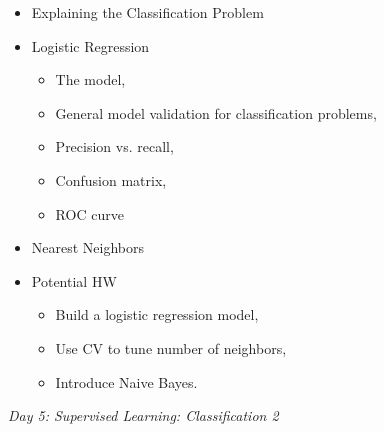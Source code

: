 \documentclass[12pt]{article}
\begin{document}
	\noindent
	\begin{itemize}
		\item Explaining the Classification Problem
		\item Logistic Regression
			\begin{itemize}
				\item The model,
				\item General model validation for classification problems,
				\item Precision vs. recall,
				\item Confusion matrix,
				\item ROC curve
			\end{itemize}
		\item Nearest Neighbors
		\item Potential HW
			\begin{itemize}
				\item Build a logistic regression model,
				\item Use CV to tune number of neighbors,
				\item Introduce Naive Bayes.
			\end{itemize}
	\end{itemize}
	
	\vspace{2mm}
	\noindent
	\textit{\large{Day 5: Supervised Learning: Classification 2}}
	
\end{document}
